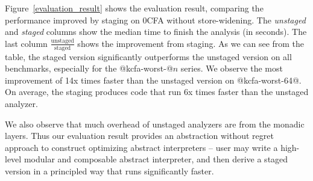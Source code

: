 Figure~\ref{evaluation_result} shows the evaluation result, comparing the
performance improved by staging on 0CFA without store-widening. The
\textit{unstaged} and \textit{staged} columns show the median time to finish the
analysis (in seconds). The last column $\frac{\text{unstaged}}{\text{staged}}$
shows the improvement from staging. 
As we can see from the table, the staged version significantly outperforms the
unstaged version on all benchmarks, especially for the @kcfa-worst-@$n$ series.
We observe the most improvement of 14x times faster than the unstaged version on
@kcfa-worst-64@. On average, the staging produces code that run 6x times faster
than the unstaged analyzer.

We also observe that much overhead of unstaged analyzers are from the monadic
layers. Thus our evaluation result provides an abstraction without regret
approach to construct optimizing abstract interpreters -- user may write a
high-level modular and composable abstract interpreter, and then derive a staged
version in a principled way that runs significantly faster.

\iffalse
As we can see from the table, the staged version significantly outperforms the
unstaged especially for the difficult ones. However, for some benchmarks, we
observe degraded performance. We conjecture this happens due to the fact that
the large size of the generated code is unoptimized -- as what we test here is a
simple implementation almost identical to what we described in the previous
sections, we believe the performance still can be improved if more engineering
effort is taken, such as optimizing code generation and avoiding code
duplication.
\fi
